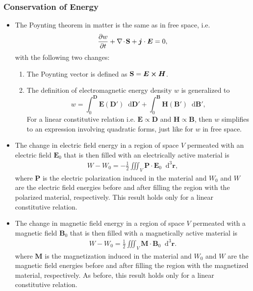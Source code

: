 \documentclass[11pt, a4paper]{article}
\newcommand{\diff}{\mathop{}\!\mathrm{d}} %
\newcommand{\dr}{\diff^{3} \r}  %
\renewcommand{\vec}[1]{\bm{#1}} %
\renewcommand{\r}{\vec{r}}
\newcommand{\E}{\vec{E}} %
\newcommand{\D}{\vec{D}}  %
\newcommand{\B}{\vec{B}} %
\renewcommand{\H}{\vec{H}}  %
\renewcommand{\P}{\vec{P}}  %
\newcommand{\M}{\vec{M}}  %
\renewcommand{\S}{\mathbf{S}}  %
\renewcommand{\j}{\vec{j}}  %
\renewcommand{\div}{\nabla \mspace{-2mu} \cdot \mspace{-2mu}}
\begin{document}
\subsubsection{Conservation of Energy}
\begin{itemize}
    \item The Poynting theorem in matter is the same as in free space, i.e.
	\begin{equation*}
		\pdv{w}{t} + \div \S  + \j \cdot \E = 0,
	\end{equation*}
    with the following two changes:
    \begin{enumerate}

        \item The Poynting vector is defined as $ \S = \E \cross \H $.

        \item The definition of electromagnetic energy density $ w $ is generalized to
        \begin{equation*}
            w = \int_{0}^{\D} \E(\D') \diff \D' + \int_{0}^{\B}\H(\B')\diff \B',
        \end{equation*}
        For a linear constitutive relation i.e. $ \E \propto \D $ and $ \H \propto \B $, then $ w $ simplifies to an expression involving quadratic forms, just like for $ w $ in free space.

    \end{enumerate}


    \item The change in electric field energy in a region of space $ V $ permeated with an electric field $ \E_{0} $ that is then filled with an electrically active material is
	\begin{align*}
		W - W_{0} = -\frac{1}{2}\iiint_{V}\P \cdot \E_{0}\dr,
	\end{align*}
    where $ \P $ is the electric polarization induced in the material and $ W_{0} $ and $ W $ are the electric field energies before and after filling the region with the polarized material, respectively. This result holds only for a linear constitutive relation.
	
    \item The change in magnetic field energy in a region of space $ V $ permeated with a magnetic field $ \B_{0} $ that is then filled with a magnetically active material is
	\begin{align*}
		W - W_{0} = \frac{1}{2}\iiint_{V}\M \cdot \B_{0}\dr.
	\end{align*}
    where $ \M $ is the magnetization induced in the material and $ W_{0} $ and $ W $ are the magnetic field energies before and after filling the region with the magnetized material, respectively. As before, this result holds only for a linear constitutive relation.

\end{itemize}
\end{document}
